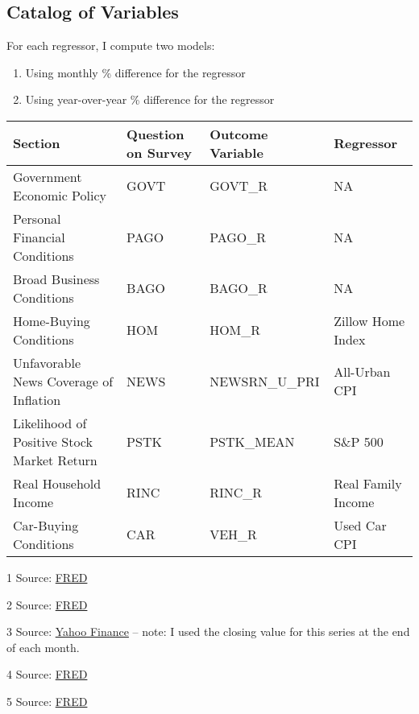 \documentclass{article}
\begin{document}
\subsection{Catalog of Variables}
For each regressor, I compute two models:
\begin{enumerate} 
	\item Using monthly \% difference for the regressor
	\item Using year-over-year \% difference for the regressor
\end{enumerate}
\begin{table}[h!]
\begin{threeparttable}
\begin{tabular}{|l|l|l|l|}
\hline
\textbf{Section} 							& \textbf{Question on Survey} 	& \textbf{Outcome Variable} 	& \textbf{Regressor} 		\\ \hline
Government Economic Policy      			& GOVT      				& GOVT\_R 				&   NA  				\\ \hline
Personal Financial Conditions      			& PAGO      				& PAGO\_R  				&   NA 				\\ \hline
Broad Business Conditions     				& BAGO      				& BAGO\_R 				&   NA 				\\ \hline
Home-Buying Conditions		     			& HOM      				& HOM\_R  				&   Zillow Home Index\tnote{1}	\\ \hline
Unfavorable News Coverage of Inflation    	& NEWS      				& NEWSRN\_U\_PRI  		&   All-Urban CPI\tnote{2}		\\ \hline
Likelihood of Positive Stock Market Return 	& PSTK     				& PSTK\_MEAN  			&   S\&P 500\tnote{3}	 \\ \hline
Real Household Income     				& RINC      				& RINC\_R 				&   Real Family Income\tnote{4} \\ \hline
Car-Buying Conditions      					& CAR      				& VEH\_R 				&   Used Car CPI\tnote{5} \\ \hline
\end{tabular}
\begin{tablenotes} 
\footnotesize
\item[1] Source: \href{https://fred.stlouisfed.org/series/USAUCSFRCONDOSMSAMID}{FRED} 
\item[2] Source: \href{https://fred.stlouisfed.org/series/CPIAUCSL}{FRED}
\item[3] Source: \href{https://finance.yahoo.com/quote/\%5EGSPC/}{Yahoo Finance} -- note: I used the closing value for this series at the end of each month.
\item[4] Source: \href{https://fred.stlouisfed.org/series/A229RX0}{FRED}
\item[5] Source: \href{https://fred.stlouisfed.org/series/CUSR0000SETA02}{FRED} 
\end{tablenotes}
\end{threeparttable}
\end{table}
\end{document}
